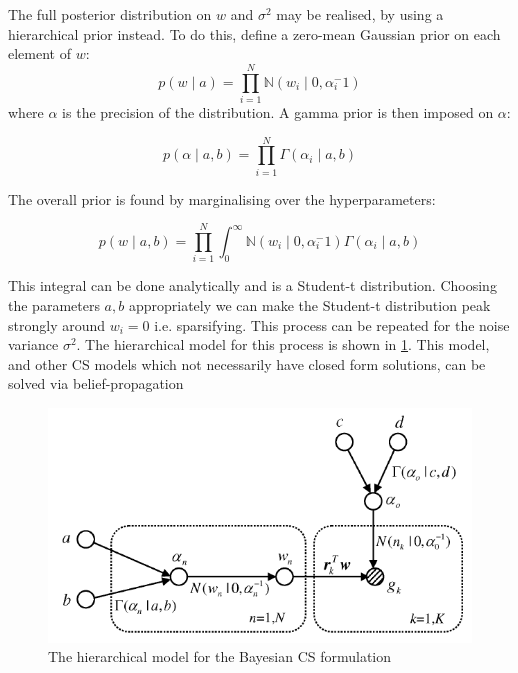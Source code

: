 \documentclass[12pt, a4paper]{article}
\begin{document}
The full posterior distribution on \(w\) and \(\sigma^2\) may be realised, by using a hierarchical prior instead. To do this, define a zero-mean Gaussian prior on each element of \(w\):
%
\begin{equation}
p\left(w\mid a\right) = \prod_{i=1}^{N}\mathbb{N}\left(w_i\mid 0, \alpha_{i}^-1\right)
\end{equation}
%
where \(\alpha\) is the precision of the distribution. A gamma prior is then imposed on \(\alpha\):

\begin{equation}
p\left(\alpha \mid a, b \right) = \prod_{i=1}^{N} \Gamma\left( \alpha_i \mid a, b \right)
\end{equation}

The overall prior is found by marginalising over the hyperparameters:

\begin{equation}
p\left( w \mid a, b \right) = \prod_{i=1}^{N} \int_{0}^{\infty} \mathbb{N}\left(w_i\mid 0, \alpha_{i}^-1\right) \Gamma\left( \alpha_i \mid a, b \right)
\end{equation}

This integral can be done analytically and is a Student-t distribution. Choosing the parameters \(a,b\) appropriately we can make the Student-t distribution peak strongly around \(w_i = 0\) i.e. sparsifying. This process can be repeated for the noise variance \(\sigma^2\). The hierarchical model for this process is shown in \ref{bayesiancs}. This model, and other CS models which not necessarily have closed form solutions, can be solved via belief-propagation \cite{Baron2010}

\begin{figure}[h]
\centering
\includegraphics[height = 7 cm]{bayesiancs.png}
\caption{The hierarchical model for the Bayesian CS formulation \cite{Ji2008}}
\label{bayesiancs}
\end{figure}
\end{document}
